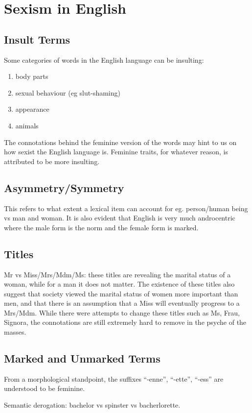 \documentclass[../main.tex]{subfiles}
\begin{document}
        \section{Sexism in English}
            \subsection{Insult Terms}
            Some categories of words in the English language can be insulting: \begin{enumerate}
                \item body parts
                \item sexual behaviour (eg slut-shaming)
                \item appearance
                \item animals
            \end{enumerate}
            The connotations behind the feminine version of the words may hint to us on how sexist the English language is. Feminine traits, for whatever reason, is attributed to be more insulting.

            \subsection{Asymmetry/Symmetry}
            This refers to what extent a lexical item can account for eg. person/human being vs man and woman. It is also evident that English is very much androcentric where the male form is the norm and the female form is marked. 

            \subsection{Titles}
            Mr vs Miss/Mrs/Mdm/Ms: these titles are revealing the marital status of a woman, while for a man it does not matter. The existence of these titles also suggest that society viewed the marital status of women more important than men, and that there is an assumption that a Miss will eventually progress to a Mrs/Mdm. While there were attempts to change these titles such as Ms, Frau, Signora, the connotations are still extremely hard to remove in the psyche of the masses. 

            \subsection{Marked and Unmarked Terms}
            From a morphological standpoint, the suffixes ``-enne'', ``-ette'', ``-ess'' are understood to be feminine. \par
            Semantic derogation: bachelor vs spinster vs bacherlorette.
\end{document}
